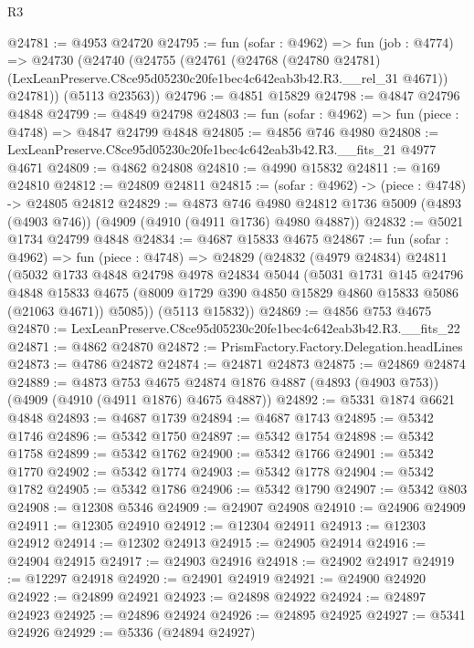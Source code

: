 \begin{lexlean}{R3}
\begin{coremodule}
@24781 := @4953 @24720
@24795 := fun (sofar : @4962) =>
  fun (job : @4774) =>
  @24730
    (@24740
      (@24755
        (@24761
          (@24768
            (@24780 @24781)
            (LexLeanPreserve.C8ce95d05230c20fe1bec4c642eab3b42.R3.__rel_31 @4671))
          @24781))
      (@5113 @23563))
@24796 := @4851 @15829
@24798 := @4847 @24796 @4848
@24799 := @4849 @24798
@24803 := fun (sofar : @4962) => fun (piece : @4748) => @4847 @24799 @4848
@24805 := @4856 @746 @4980
@24808 := LexLeanPreserve.C8ce95d05230c20fe1bec4c642eab3b42.R3.__fits_21 @4977 @4671
@24809 := @4862 @24808
@24810 := @4990 @15832
@24811 := @169 @24810
@24812 := @24809 @24811
@24815 := (sofar : @4962) -> (piece : @4748) -> @24805 @24812
@24829 := @4873
    @746
    @4980
    @24812
    @1736
    @5009
    (@4893 (@4903 @746))
    (@4909 (@4910 (@4911 @1736) @4980 @4887))
@24832 := @5021 @1734 @24799 @4848
@24834 := @4687 @15833 @4675
@24867 := fun (sofar : @4962) =>
  fun (piece : @4748) =>
  @24829
    (@24832
      (@4979 @24834)
      @24811
      (@5032
        @1733
        @4848
        @24798
        @4978
        @24834
        @5044
        (@5031
          @1731
          @145
          @24796
          @4848
          @15833
          @4675
          (@8009 @1729 @390 @4850 @15829 @4860 @15833 @5086 (@21063 @4671))
          @5085))
      (@5113 @15832))
@24869 := @4856 @753 @4675
@24870 := LexLeanPreserve.C8ce95d05230c20fe1bec4c642eab3b42.R3.__fits_22
@24871 := @4862 @24870
@24872 := PrismFactory.Factory.Delegation.headLines
@24873 := @4786 @24872
@24874 := @24871 @24873
@24875 := @24869 @24874
@24889 := @4873
    @753
    @4675
    @24874
    @1876
    @4887
    (@4893 (@4903 @753))
    (@4909 (@4910 (@4911 @1876) @4675 @4887))
@24892 := @5331 @1874 @6621 @4848
@24893 := @4687 @1739
@24894 := @4687 @1743
@24895 := @5342 @1746
@24896 := @5342 @1750
@24897 := @5342 @1754
@24898 := @5342 @1758
@24899 := @5342 @1762
@24900 := @5342 @1766
@24901 := @5342 @1770
@24902 := @5342 @1774
@24903 := @5342 @1778
@24904 := @5342 @1782
@24905 := @5342 @1786
@24906 := @5342 @1790
@24907 := @5342 @803
@24908 := @12308 @5346
@24909 := @24907 @24908
@24910 := @24906 @24909
@24911 := @12305 @24910
@24912 := @12304 @24911
@24913 := @12303 @24912
@24914 := @12302 @24913
@24915 := @24905 @24914
@24916 := @24904 @24915
@24917 := @24903 @24916
@24918 := @24902 @24917
@24919 := @12297 @24918
@24920 := @24901 @24919
@24921 := @24900 @24920
@24922 := @24899 @24921
@24923 := @24898 @24922
@24924 := @24897 @24923
@24925 := @24896 @24924
@24926 := @24895 @24925
@24927 := @5341 @24926
@24929 := @5336 (@24894 @24927)

\end{coremodule}
\end{lexlean}
